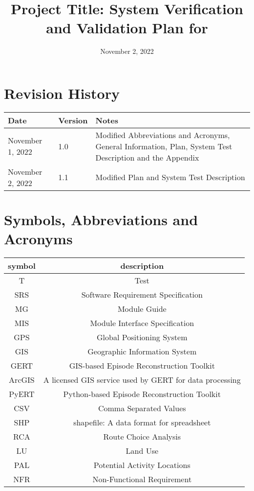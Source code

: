 \documentclass[12pt, titlepage]{article}
\begin{document}
\title{Project Title: System Verification and Validation Plan for \progname{}} 
\author{\authname}
\date{November 2, 2022}
	
\maketitle


\section{Revision History}

\begin{tabularx}{\textwidth}{p{3cm}p{2cm}X}
\toprule {\bf Date} & {\bf Version} & {\bf Notes}\\
\midrule
November 1, 2022 & 1.0 & Modified Abbreviations and Acronyms, General Information, Plan, System Test Description and the Appendix\\
November 2, 2022 & 1.1 & Modified Plan and System Test Description\\
\bottomrule
\end{tabularx}

\newpage

\tableofcontents

\listoftables

\newpage

\section{Symbols, Abbreviations and Acronyms}

\renewcommand{\arraystretch}{1.2}
\begin{tabular}{|c|c|} 
  \hline		
  \textbf{symbol} & \textbf{description}\\
  \hline
  T & Test\\
  \hline
  SRS & Software Requirement Specification\\
  \hline
  MG & Module Guide\\
  \hline
  MIS & Module Interface Specification\\
  \hline
  GPS & Global Positioning System \\
  \hline
  GIS & Geographic Information System \\
  \hline
  GERT & GIS-based Episode Reconstruction Toolkit  \\ 
  \hline
  ArcGIS & A licensed GIS service used by GERT for data processing \\
  \hline
  PyERT & Python-based Episode Reconstruction Toolkit  \\ 
  \hline
  CSV & Comma Separated Values \\
  \hline
  SHP & shapefile: A data format for spreadsheet \\
  \hline
  RCA & Route Choice Analysis \\
  \hline
  LU & Land Use \\ 
  \hline
  PAL & Potential Activity Locations \\ 
  \hline
  NFR & Non-Functional Requirement  \\
  \hline
\end{tabular}\\
\end{document}

